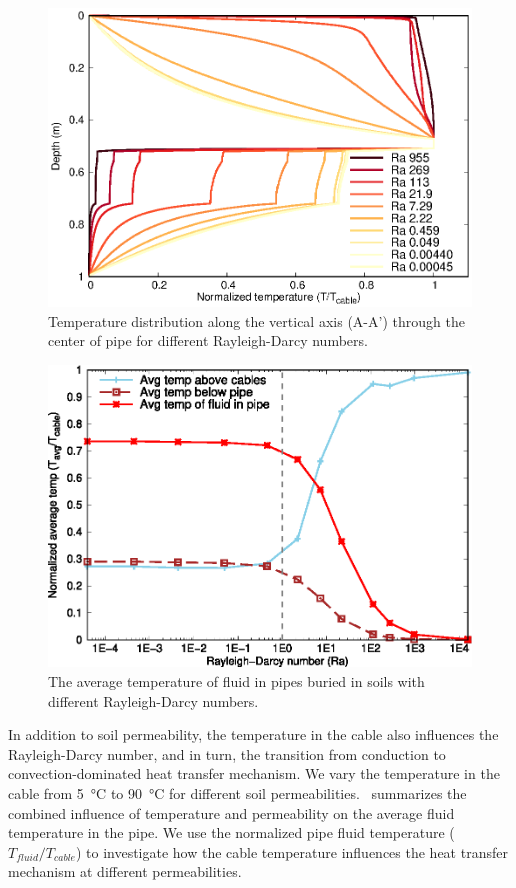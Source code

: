 \documentclass[Journal,letterpaper,InsideFigs]{ascelike-new}
\begin{document}
\begin{figure}
    \centering
    \includegraphics{figs/temp-pipe.eps}
    \caption{Temperature distribution along the vertical axis (A-A’) through the center of pipe for different Rayleigh-Darcy numbers.}
    \label{fig:ra-vline}
\end{figure}

\begin{figure}
    \centering
    \includegraphics{figs/heat-pipe.eps}
    \caption{The average temperature of fluid in pipes buried in soils with different Rayleigh-Darcy numbers.}
    \label{fig:heat-pipe}
\end{figure}

In addition to soil permeability, the temperature in the cable also influences the Rayleigh-Darcy number, and in turn, the transition from conduction to convection-dominated heat transfer mechanism. We vary the temperature in the cable from \SI{5}{\celsius} to \SI{90}{\celsius} for different soil permeabilities.~ summarizes the combined influence of temperature and permeability on the average fluid temperature in the pipe. We use the normalized pipe fluid temperature ($T_{fluid}/T_{cable}$) to investigate how the cable temperature influences the heat transfer mechanism at different permeabilities. 
\end{document}
